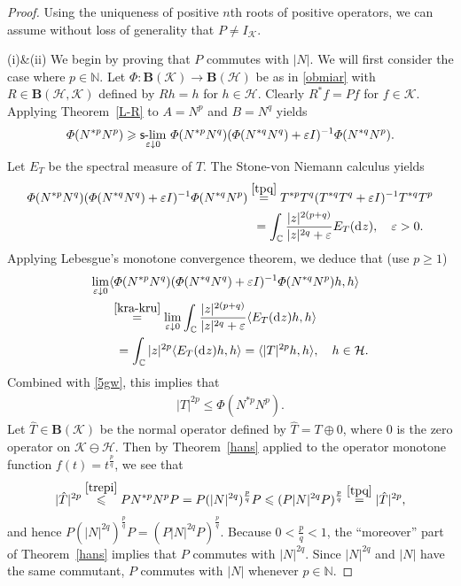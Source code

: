 \documentclass[reqno]{amsproc}
\numberwithin{equation}{section}
\theoremstyle{remark}
\newcommand*{\hh}{\mathcal{H}}
\newcommand*{\kk}{\mathcal{K}}
\newcommand*{\natu}{\mathbb{N}}
\newcommand*{\comp}{\mathbb{C}}
\newcommand*{\cbb}{\comp}
\newcommand*{\D}{\mathrm{d\hspace{.1ex}}}
\theoremstyle{definition}
\newcommand*{\Le}{\leqslant}
\newcommand*{\Ge}{\geqslant}
\newcommand*{\ogr}{\boldsymbol{B}}
\def\sslim{\qopname\relax m{{\sf{s}\textrm-}lim}}
\begin{document}
   \begin{proof}
Using the uniqueness of positive $n$th roots
of positive operators, we can assume without
loss of generality that $P \neq I_{\kk}$.

(i)\&(ii) We begin by proving that $P$
commutes with $|N|$. We will first consider
the case where $p\in \natu$. Let
$\varPhi\colon \ogr(\kk)\to \ogr(\hh)$ be as
in \eqref{obmiar} with $R\in \ogr(\hh,\kk)$
defined by $Rh=h$ for $h\in \hh$. Clearly
$R^*f=Pf$ for $f \in \kk$. Applying
Theorem~\ref{L-R} to $A=N^p$ and $B=N^q$
yields
   \begin{align}\label{5gw}
\varPhi(N^{*p}N^p) \Ge
\sslim_{\varepsilon\downarrow 0} \,
\varPhi(N^{*p}N^q)(\varPhi(N^{*q}N^q)+\varepsilon
I)^{-1} \varPhi(N^{*q}N^p).
   \end{align}
Let $E_{T}$ be the spectral measure of $T$.
The Stone-von Niemann calculus yields
   \allowdisplaybreaks
   \begin{align} \notag
\varPhi(N^{*p}N^q)(\varPhi(N^{*q}N^q)+\varepsilon
I)^{-1}\varPhi(N^{*q}N^p) &
\overset{\eqref{tpq}} =
T^{*p}T^q(T^{*q}T^{q}+\varepsilon
I)^{-1}T^{*q}T^p
   \\ \label{kra-kru}
& \hspace{1ex} =\int_\cbb
\frac{|z|^{2(p+q)}}{|z|^{2q}+\varepsilon}E_{T}(\D
z), \quad \varepsilon > 0.
   \end{align}
Applying Lebesgue's monotone convergence
theorem, we deduce that (use $p\Ge 1$)
   \allowdisplaybreaks
   \begin{align} \notag
\lim_{\varepsilon\downarrow 0} &
\langle\varPhi(N^{*p}N^q)(\varPhi(N^{*q}N^q)+\varepsilon
I)^{-1}\varPhi(N^{*q}N^p)h, h\rangle
   \\ \notag
& \hspace{.2ex}\overset{\eqref{kra-kru}} =
\lim_{\varepsilon\downarrow 0} \int_\cbb
\frac{|z|^{2(p+q)}}{|z|^{2q}+\varepsilon}\langle
E_{T}(\D z)h,h\rangle
   \\  \label{lyncylk}
& \hspace{1.2ex} =\int_\cbb {|z|^{2p}}\langle E_{T}(\D
z)h, h\rangle = \langle |T|^{2p}h,h\rangle, \quad h
\in \hh.
   \end{align}
Combined with \eqref{5gw}, this implies that
   \begin{align} \label{trepi}
|T|^{2p}\Le \varPhi(N^{*p}N^p).
   \end{align}
Let $\hat T\in \ogr(\kk)$ be the normal
operator defined by $\hat T = T \oplus 0$,
where $0$ is the zero operator on
$\kk\ominus \hh$. Then by Theorem~\ref{hans}
applied to the operator monotone function
$f(t)=t^{\frac{p}{q}}$, we see that
   \begin{align*}
|\hat T|^{2p} \overset{\eqref{trepi}}{\Le}
PN^{*p}N^p P = P (|N|^{2q})^{\frac{p}{q}}P
\Le (P|N|^{2q}P)^\frac{p}{q}
\overset{\eqref{tpq}}= |\hat T|^{2p},
   \end{align*}
and hence $P (|N|^{2q})^{\frac{p}{q}}P =
(P|N|^{2q}P)^\frac{p}{q}$. Because $0<\frac{p}{q} <
1$, the ``moreover'' part of Theorem~\ref{hans}
implies that $P$ commutes with $|N|^{2q}$. Since
$|N|^{2q}$ and $|N|$ have the same commutant, $P$
commutes with $|N|$ whenever $p\in \natu$.


\end{proof}
\end{document}
